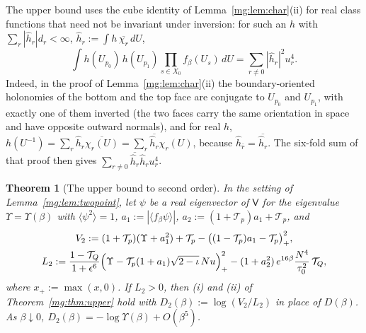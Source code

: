 \documentclass[11pt,a4paper]{article}
\newtheorem{theorem}{Theorem}[section]
\theoremstyle{definition}
\theoremstyle{remark}
\newcommand{\dU}{\,dU}
\begin{document}
The upper bound uses the cube identity of Lemma~\ref{mg:lem:char}(ii) for real class functions that need not be invariant under inversion: for such
an $h$ with $\sum_r|\hat h_r|d_r<\infty$, $\hat h_r:=\int h\,\overline{\chi_r}\dU$,
\begin{equation}\label{mg:eq:cubereal}
\int h(U_{p_0})\,h(U_{p_1})\prod_{s\in X_0}f_\beta(U_s)\dU=\sum_{r\neq0}|\hat h_r|^2u_r^4 .
\end{equation}
Indeed, in the proof of Lemma~\ref{mg:lem:char}(ii) the boundary-oriented holonomies of the bottom and the top face are conjugate to $U_{p_0}$ and
$U_{p_1}$, with exactly one of them inverted (the two faces carry the same orientation in space and have opposite outward normals), and for real $h$,
$h(U^{-1})=\sum_r\hat h_r\overline{\chi_r(U)}=\sum_r\overline{\hat h_r}\chi_r(U)$, because $\hat h_{\bar r}=\overline{\hat h_r}$. The six-fold sum of that proof
then gives $\sum_{r\ne0}\overline{\hat h_r}\hat h_ru_r^4$.

\begin{theorem}[The upper bound to second order]\label{mg:thm:upper2}
In the setting of Lemma~\ref{mg:lem:twopoint}, let $\psi$ be a real eigenvector of $\mathsf V$ for the eigenvalue $\Upsilon=\Upsilon(\beta)$ with
$\langle\psi^2\rangle=1$, $a_1:=|\langle f_\beta\psi\rangle|$, $a_2:=(1+\mathcal T_p)a_1+\mathcal T_p$, and
\begin{gather*}
V_2:=(1+\mathcal T_p)(\Upsilon+a_1^2)+\mathcal T_p-\bigl((1-\mathcal T_p)a_1-\mathcal T_p\bigr)_+^2,\\
L_2:=\frac{1-\mathcal T_Q}{1+\epsilon^6}\Bigl(\Upsilon-\mathcal T_p(1+a_1)\sqrt{2-\iota}\,Nu\Bigr)_+^2-(1+a_2^2)\,e^{16\beta}\frac{N^4}{\tau_0^2}\,\mathcal T_Q ,
\end{gather*}
where $x_+:=\max(x,0)$. If $L_2>0$, then (i) and (ii) of Theorem~\ref{mg:thm:upper} hold with $D_2(\beta):=\log(V_2/L_2)$ in place of $D(\beta)$.
As $\beta\downarrow0$, $D_2(\beta)=-\log\Upsilon(\beta)+O(\beta^5)$.
\end{theorem}
\end{document}
